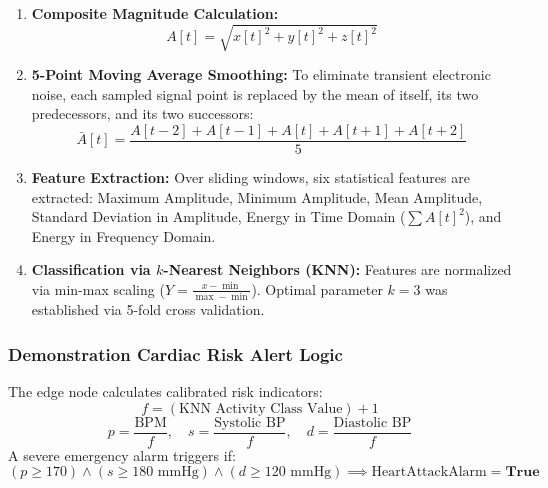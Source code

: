 \begin{enumerate}[leftmargin=*]
  \item \textbf{Composite Magnitude Calculation:}
  \begin{equation}
  A[t] = \sqrt{x[t]^2 + y[t]^2 + z[t]^2}
  \end{equation}
  \item \textbf{5-Point Moving Average Smoothing:} To eliminate transient electronic noise, each sampled signal point is replaced by the mean of itself, its two predecessors, and its two successors:
  \begin{equation}
  \bar{A}[t] = \frac{A[t-2] + A[t-1] + A[t] + A[t+1] + A[t+2]}{5}
  \end{equation}
  \item \textbf{Feature Extraction:} Over sliding windows, six statistical features are extracted: Maximum Amplitude, Minimum Amplitude, Mean Amplitude, Standard Deviation in Amplitude, Energy in Time Domain ($\sum A[t]^2$), and Energy in Frequency Domain.
  \item \textbf{Classification via $k$-Nearest Neighbors (KNN):} Features are normalized via min-max scaling ($Y = \frac{x - \min}{\max - \min}$). Optimal parameter $k=3$ was established via 5-fold cross validation.
\end{enumerate}

\subsubsection{Demonstration Cardiac Risk Alert Logic}
The edge node calculates calibrated risk indicators:
\begin{equation}
f = (\text{KNN Activity Class Value}) + 1
\end{equation}
\begin{equation}
p = \frac{\text{BPM}}{f}, \quad s = \frac{\text{Systolic BP}}{f}, \quad d = \frac{\text{Diastolic BP}}{f}
\end{equation}
A severe emergency alarm triggers if:
\begin{equation}
(p \ge 170) \land (s \ge 180\text{ mmHg}) \land (d \ge 120\text{ mmHg}) \implies \text{HeartAttackAlarm} = \mathbf{True}
\end{equation}

